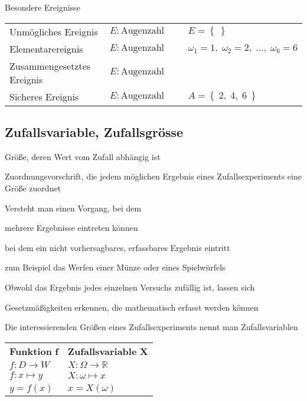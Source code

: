 \documentclass[
	final,
	a4paper,
	oneside,
	parskip=full,
	headings=standardclasses,
	headings=big,
	pointednumbers
]{scrartcl}
\newcommand{\kl}[1]{{\left( #1 \right)}}
\newcommand{\kq}[1]{{\left\{ #1 \right\}}}
\begin{document}
    Besondere Ereignisse

    \begin{tabular}{lll}
        Unmögliches Ereignis        & ${E:} \text{Augenzahl grösser als 6}$ & $E = \kq{ \; }$ \\
        Elementarereignis           & $E: \text{Augenzahl grösser als 6}$ & $\omega_1 = 1, \; \omega_2 = 2, \; \ldots, \; \omega_6 = 6$ \\
        Zusammengesetztes Ereignis  & $E: \text{Augenzahl grösser als 6}$ & \\
        Sicheres Ereignis           & $E: \text{Augenzahl grösser als 6}$ & $A = \kq{\; 2, \; 4, \; 6 \; }$ \\
    \end{tabular}
    

    \subsection{Zufallsvariable, Zufallsgrösse}

    \begin{tabenum}
        \item{Größe, deren Wert vom Zufall abhängig ist}
        \item{Zuordnungsvorschrift, die jedem möglichen Ergebnis eines Zufallsexperiments eine Größe zuordnet}
        \item{Versteht man einen Vorgang, bei dem}
        \begin{tabenum}
            \item{mehrere Ergebnisse eintreten können}
            \item{bei dem ein nicht vorhersagbares, erfassbares Ergebnis eintritt}
            \item{zum Beispiel das Werfen einer Münze oder eines Spielwürfels}
        \end{tabenum}
        \item{Obwohl das Ergebnis jedes einzelnen Versuchs zufällig ist, lassen sich}
        \begin{tabenum}
            \item{Gesetzmäßigkeiten erkennen, die mathematisch erfasst werden können}
            \item{Die interessierenden Größen eines Zufallsexperiments nennt man Zufallsvariablen}
        \end{tabenum}
    \end{tabenum}

    \begin{tabular}{ll}
        \textbf{Funktion} $\bm{f}$  & \textbf{Zufallsvariable} $\bm{X}$ \\
        $f: D \rightarrow W $       & $X: \Omega \rightarrow \mathbb{R}$ \\
        $f: x \mapsto y $           & $X: \omega \mapsto x $ \\
        $y = f\kl{x} $              & $x = X\kl{\omega}$ \\
    \end{tabular}
\end{document}
